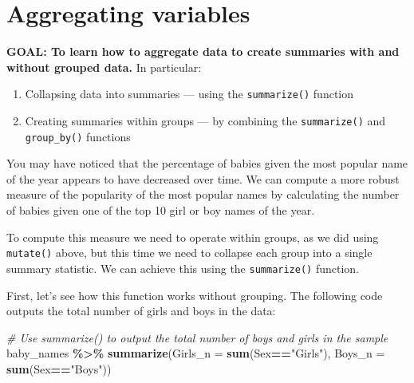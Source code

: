 \documentclass[
]{book}
\newenvironment{Shaded}{\begin{snugshade}}{\end{snugshade}}
\newcommand{\CommentTok}[1]{\textcolor[rgb]{0.56,0.35,0.01}{\textit{#1}}}
\newcommand{\DataTypeTok}[1]{\textcolor[rgb]{0.13,0.29,0.53}{#1}}
\newcommand{\KeywordTok}[1]{\textcolor[rgb]{0.13,0.29,0.53}{\textbf{#1}}}
\newcommand{\NormalTok}[1]{#1}
\newcommand{\OperatorTok}[1]{\textcolor[rgb]{0.81,0.36,0.00}{\textbf{#1}}}
\newcommand{\StringTok}[1]{\textcolor[rgb]{0.31,0.60,0.02}{#1}}
\providecommand{\tightlist}{%
  \setlength{\itemsep}{0pt}\setlength{\parskip}{0pt}}
\begin{document}
\hypertarget{aggregating-variables}{%
\section{Aggregating variables}\label{aggregating-variables}}

\begin{alert}

\textbf{GOAL: To learn how to aggregate data to create summaries with and without grouped data.} In particular:

\begin{enumerate}
\def\labelenumi{\arabic{enumi}.}
\tightlist
\item
  Collapsing data into summaries --- using the \texttt{summarize()} function
\item
  Creating summaries within groups --- by combining the \texttt{summarize()} and \texttt{group\_by()} functions
\end{enumerate}

\end{alert}

You may have noticed that the percentage of babies given the most
popular name of the year appears to have decreased over time. We can
compute a more robust measure of the popularity of the most popular
names by calculating the number of babies given one of the top 10 girl
or boy names of the year.

To compute this measure we need to operate within groups, as
we did using \texttt{mutate()} above, but this time we need to collapse each
group into a single summary statistic. We can achieve this using the
\texttt{summarize()} function.

First, let's see how this function works without grouping. The following
code outputs the total number of girls and boys in the data:

\begin{Shaded}
\begin{Highlighting}[]
\CommentTok{\# Use summarize() to output the total number of boys and girls in the sample}
\NormalTok{baby\_names }\OperatorTok{\%\textgreater{}\%}\StringTok{ }
\StringTok{  }\KeywordTok{summarize}\NormalTok{(}\DataTypeTok{Girls\_n =} \KeywordTok{sum}\NormalTok{(Sex}\OperatorTok{==}\StringTok{"Girls"}\NormalTok{),}
            \DataTypeTok{Boys\_n =} \KeywordTok{sum}\NormalTok{(Sex}\OperatorTok{==}\StringTok{"Boys"}\NormalTok{))}
\end{Highlighting}
\end{Shaded}
\end{document}
